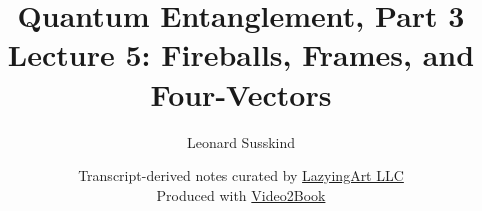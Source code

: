 \documentclass[11pt,oneside]{book}
\begin{document}
\hypersetup{pageanchor=false}
\frontmatter
\title{Quantum Entanglement, Part 3\\[0.45em]
\large Lecture 5: Fireballs, Frames, and Four-Vectors}
\author{Leonard Susskind}
\date{Transcript-derived notes curated by
\href{https://lazying.art}{LazyingArt LLC}\\[0.35em]
\small Produced with
\href{https://github.com/lachlanchen/Video2Book}{Video2Book}}
\maketitle
\hypersetup{pageanchor=true}
\mainmatter

\end{document}
